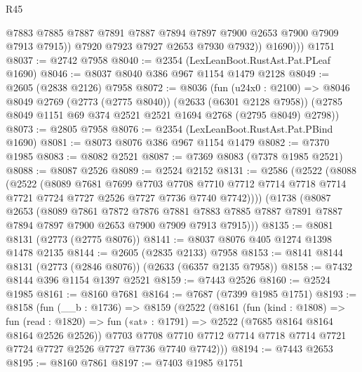 \begin{lexlean}{R45}
\begin{coremodule}
                @7883
                @7885
                @7887
                @7891
                @7887
                @7894
                @7897
                @7900
                @2653
                @7900
                @7909
                @7913
                @7915))
            @7920
            @7923
            @7927
            @2653
            @7930
            @7932))
          @1690)))
    @1751
@8037 := @2742 @7958
@8040 := @2354 (LexLeanBoot.RustAst.Pat.PLeaf @1690)
@8046 := @8037 @8040 @386 @967 @1154 @1479 @2128
@8049 := @2605 (@2838 @2126) @7958
@8072 := @8036
    (fun (u24x0 : @2100) =>
    @8046
      @8049
      @2769
      (@2773 (@2775 @8040))
      (@2633 (@6301 @2128 @7958))
      (@2785 @8049 @1151 @69 @374 @2521 @2521 @1694 @2768 (@2795 @8049) @2798))
@8073 := @2805 @7958
@8076 := @2354 (LexLeanBoot.RustAst.Pat.PBind @1690)
@8081 := @8073 @8076 @386 @967 @1154 @1479
@8082 := @7370 @1985
@8083 := @8082 @2521
@8087 := @7369 @8083 (@7378 @1985 @2521)
@8088 := @8087 @2526
@8089 := @2524 @2152
@8131 := @2586
    (@2522
      (@8088
        (@2522
          (@8089
            @7681
            @7699
            @7703
            @7708
            @7710
            @7712
            @7714
            @7718
            @7714
            @7721
            @7724
            @7727
            @2526
            @7727
            @7736
            @7740
            @7742))))
    (@1738
      (@8087
        @2653
        (@8089
          @7861
          @7872
          @7876
          @7881
          @7883
          @7885
          @7887
          @7891
          @7887
          @7894
          @7897
          @7900
          @2653
          @7900
          @7909
          @7913
          @7915)))
@8135 := @8081 @8131 (@2773 (@2775 @8076))
@8141 := @8037 @8076 @405 @1274 @1398 @1478 @2135
@8144 := @2605 (@2835 @2133) @7958
@8153 := @8141 @8144 @8131 (@2773 (@2846 @8076)) (@2633 (@6357 @2135 @7958))
@8158 := @7432 @8144 @396 @1154 @1397 @2521
@8159 := @7443 @2526
@8160 := @2524 @1985
@8161 := @8160 @7681
@8164 := @7687 (@7399 @1985 @1751)
@8193 := @8158
    (fun (__b : @1736) =>
    @8159
      (@2522
        (@8161
          (fun (kind : @1808) =>
          fun (read : @1820) => fun («at» : @1791) => @2522 (@7685 @8164 @8164 @8164 @2526 @2526))
          @7703
          @7708
          @7710
          @7712
          @7714
          @7718
          @7714
          @7721
          @7724
          @7727
          @2526
          @7727
          @7736
          @7740
          @7742)))
@8194 := @7443 @2653
@8195 := @8160 @7861
@8197 := @7403 @1985 @1751

\end{coremodule}
\end{lexlean}

